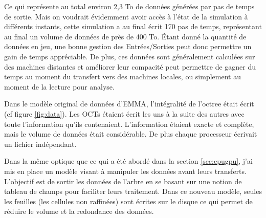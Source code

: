 Ce qui représente au total environ 2,3 To de données générées par pas de temps de sortie.
Mais on voudrait évidemment avoir accès à l'état de la simulation à différents instants, cette simulation a au final écrit 170 pas de temps, représentant au final un volume de données de près de 400 To.
Étant donné la quantité de données en jeu, une bonne gestion des Entrées/Sorties peut donc permettre un gain de temps appréciable.
De plus, ces données sont généralement calculées sur des machines distantes et améliorer leur compacité peut permettre de gagner du temps au moment du transfert vers des machines locales, ou simplement au moment de la lecture pour analyse.


Dans le modèle original de données d'EMMA, l'intégralité de l'octree était écrit (cf figure \ref{fig:data}).
Les OCTs étaient écrit les uns à la suite des autres avec toute l'information qu'ils contenaient.
L'information étaient exacte et complète, mais le volume de données était considérable.
De plus chaque processeur écrivait un fichier indépendant.

Dans la même optique que ce qui a été abordé dans la section \ref{sec:cpugpu}, j'ai mis en place un modèle visant à manipuler les données avant leurs transferts.
L'objectif est de sortir les données de l'arbre en se basant sur une notion de tableau de champs pour faciliter leurs traitement.
Dans ce nouveau modèle, seules les feuilles (les cellules non raffinées) sont écrites sur le disque ce qui permet de réduire le volume et la redondance des données.


